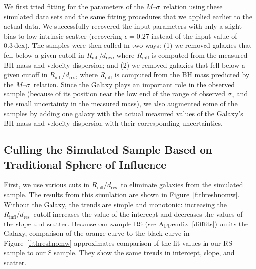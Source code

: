 \documentclass[twosided,letterpaper,numberedappendix]{emulateapj}
\newcommand{\msigma}   {\ensuremath{M}{--}\ensuremath{\sigma}}
\newcommand{\rinfres} {\ensuremath{R_{\mathrm{infl}} / d_{\mathrm{res}}}}
\begin{document}
We first tried fitting for the parameters of the \msigma\ relation
using these simulated data sets and the same fitting procedures that
we applied earlier to the actual data.  We successfully recovered the
input parameters with only a slight bias to low intrinsic scatter 
(recovering $\epsilon = 0.27$ instead of the input value of
$0.3~\mathrm{dex}$). The samples were then culled in two ways: (1) we
removed galaxies that fell below a given cutoff in \rinfres, where
$R_\mathrm{infl}$ is computed from the measured BH mass and
velocity dispersion; and (2) we removed galaxies that fell below a given
cutoff in \rinfres, where $R_\mathrm{infl}$ is computed from the
BH mass predicted by the \msigma\ relation.  Since the Galaxy
plays an important role in the observed sample (because of its
position near the low end of the range of observed $\sigma_e$ and the
small uncertainty in the measured mass), we also augmented some of the
samples by adding one galaxy with the actual measured values of the
Galaxy's BH mass and velocity dispersion with their
corresponding uncertainties.



\subsection{Culling the Simulated Sample Based on Traditional Sphere 
of Influence}
\label{mcthresh}
First, we use various cuts in \rinfres\ to eliminate galaxies from the
simulated sample.  The results from this simulation are shown in
Figure~\ref{f:threshnomw}.  Without the Galaxy, the trends are simple
and monotonic: increasing the \rinfres\ cutoff increases the value of
the intercept and decreases the values of the slope and scatter.
Because our sample RS (see Appendix~\ref{difffits}) omits the Galaxy,
comparison of the orange curve to the black curve in
Figure~\ref{f:threshnomw} approximates comparison of the fit values in
our RS sample to our S sample.  They show the same trends in
intercept, slope, and scatter.
\end{document}
